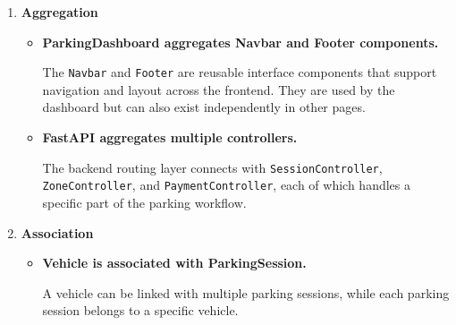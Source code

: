 \documentclass[12pt,a4paper,oneside]{report}
\begin{document}
\begin{enumerate}
\begin{itemize}
        \item \textbf{Payment routes depend on database-access helpers and session data.}

        The payment modules use stored session information and database queries to complete checkout, pay unpaid sessions, and return notices or monitoring summaries.

        \item \textbf{SessionService depends on PlateDetectionService and FeeCalculationService.}

        The \texttt{SessionService} relies on fee-calculation support for determining parking costs and interacts with related session-validation helpers during parking operations.

        \item \textbf{PlateDetectionService depends on YOLOv8 and OCR libraries.}

        The \texttt{PlateDetectionService} uses Ultralytics YOLOv8 for plate-region detection and EasyOCR for text recognition, together with OpenCV for image decoding and cropping.
    \end{itemize}

    \item \textbf{Aggregation}
    \begin{itemize}
        \item \textbf{ParkingDashboard aggregates Navbar and Footer components.}

        The \texttt{Navbar} and \texttt{Footer} are reusable interface components that support navigation and layout across the frontend. They are used by the dashboard but can also exist independently in other pages.

        \item \textbf{FastAPI aggregates multiple controllers.}

        The backend routing layer connects with \texttt{SessionController}, \texttt{ZoneController}, and \texttt{PaymentController}, each of which handles a specific part of the parking workflow.
    \end{itemize}

    \item \textbf{Association}
    \begin{itemize}
        \item \textbf{Vehicle is associated with ParkingSession.}

        A vehicle can be linked with multiple parking sessions, while each parking session belongs to a specific vehicle.


\end{itemize}
\end{enumerate}
\end{document}
